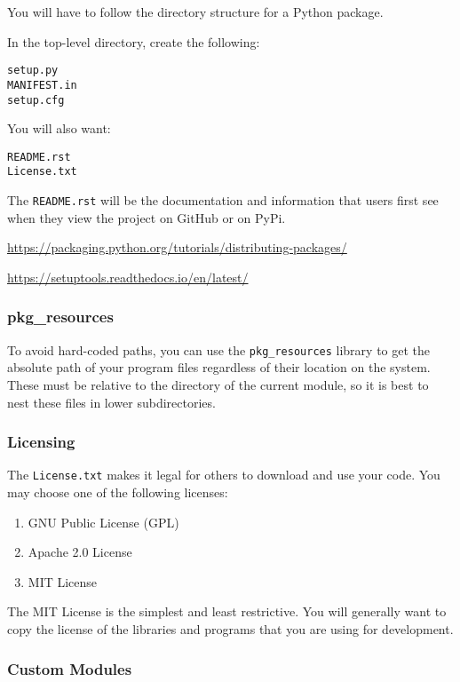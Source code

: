 \documentclass{article}
\begin{document}
You will have to follow the directory structure for a
Python package.

In the top-level directory, create the following:
\begin{verbatim}
setup.py
MANIFEST.in
setup.cfg
\end{verbatim}
You will also want:
\begin{verbatim}
README.rst
License.txt
\end{verbatim}
The \texttt{README.rst} will be the documentation and information
that users first see when they view the project on GitHub 
or on PyPi.

\url{https://packaging.python.org/tutorials/distributing-packages/}

\url{https://setuptools.readthedocs.io/en/latest/}

\subsubsection{pkg\_resources}

To avoid hard-coded paths, you can use the \texttt{pkg\_resources} library
to get the absolute path of your program files regardless of their 
location on the system. These must be relative to the directory
of the current module, so it is best to nest these files in lower
subdirectories.


\subsubsection{Licensing}

The \texttt{License.txt} makes it legal for others to download 
and use your code. You may choose one of the following
licenses:

\begin{enumerate}
\item GNU Public License (GPL)
\item Apache 2.0 License
\item MIT License
\end{enumerate}

The MIT License is the simplest and least restrictive.
You will generally want to copy the license of the 
libraries and programs that you are using for development.

\subsubsection{Custom Modules}
\end{document}
